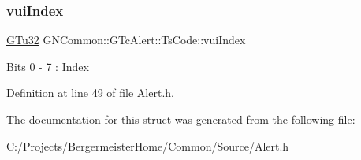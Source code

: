 \mbox{\label{struct_g_n_common_1_1_g_tc_alert_1_1_ts_code_a26e48af7d046561144f85fe111cbc8b3}} 
\subsubsection{\texorpdfstring{vui\+Index}{vuiIndex}}
{\footnotesize\ttfamily \mbox{\hyperlink{namespace_g_n_common_ae5485474bc8f23e462e920a17b377b53}{G\+Tu32}} G\+N\+Common\+::\+G\+Tc\+Alert\+::\+Ts\+Code\+::vui\+Index}

Bits 0 -\/ 7 \+: Index 

Definition at line 49 of file Alert.\+h.



The documentation for this struct was generated from the following file\+:\begin{DoxyCompactItemize}
\item 
C\+:/\+Projects/\+Bergermeister\+Home/\+Common/\+Source/Alert.\+h\end{DoxyCompactItemize}
